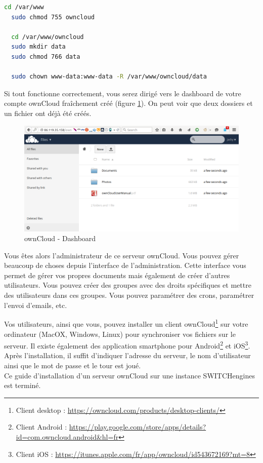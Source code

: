 \begin{lstlisting}[language=bash]
  cd /var/www
  sudo chmod 755 owncloud
  
  cd /var/www/owncloud
  sudo mkdir data
  sudo chmod 766 data

  sudo chown www-data:www-data -R /var/www/owncloud/data
\end{lstlisting}

Si tout fonctionne correctement, vous serez dirigé vers le dashboard de votre compte ownCloud fraîchement créé (figure \ref{ocdashboard}). On peut voir que deux dossiers et un fichier ont déjà été créés.

\begin{figure}[h]
  \centering
    \includegraphics[width=\linewidth]{img/OCDashboard.png}
  \caption{ownCloud - Dashboard}
  \label{ocdashboard}
\end{figure}

\newpage

Vous êtes alors l'administrateur de ce serveur ownCloud. Vous pouvez gérer beaucoup de choses depuis l'interface de l'administration. Cette interface vous permet de gérer vos propres documents mais également de créer d'autres utilisateurs. Vous pouvez créer des groupes avec des droits spécifiques et mettre des utilisateurs dans ces groupes. Vous pouvez paramétrer des crons, paramétrer l'envoi d'emails, etc. 

Vos utilisateurs, ainsi que vous, pouvez installer un client ownCloud\footnote{Client desktop : \url{https://owncloud.com/products/desktop-clients/}} sur votre ordinateur (MacOX, Windows, Linux) pour synchroniser vos fichiers sur le serveur. Il existe également des application smartphone pour Android\footnote{Client Android : \url{https://play.google.com/store/apps/details?id=com.owncloud.android&hl=fr}} et iOS\footnote{Client iOS : \url{https://itunes.apple.com/fr/app/owncloud/id543672169?mt=8}}. Après l'installation, il suffit d'indiquer l'adresse du serveur, le nom d'utilisateur ainsi que le mot de passe et le tour est joué.\\

Ce guide d'installation d'un serveur ownCloud sur une instance SWITCHengines est terminé.
